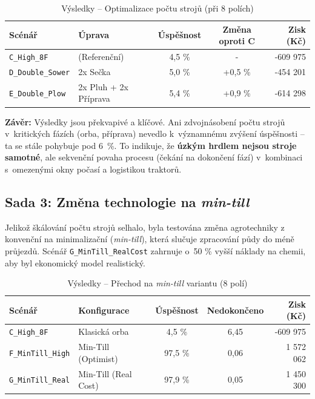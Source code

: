 \documentclass[11pt,a4paper]{article}
\begin{document}
\begin{table}[H]
    \centering
    \begin{tabular}{|l|l|c|c|r|}
        \hline
        \textbf{Scénář} & \textbf{Úprava} & \textbf{Úspěšnost} & \textbf{Změna oproti C} & \textbf{Zisk (Kč)} \\ \hline
        \texttt{C\_High\_8F} & (Referenční) & 4,5 \% & - & -609 975 \\ \hline
        \texttt{D\_Double\_Sower} & 2x Sečka & 5,0 \% & +0,5 \% & -454 201 \\ \hline
        \texttt{E\_Double\_Plow} & 2x Pluh + 2x Příprava & 5,4 \% & +0,9 \% & -614 298 \\ \hline
    \end{tabular}
    \caption{Výsledky -- Optimalizace počtu strojů (při 8 polích)}
    \label{tab:bottleneck}
\end{table}

\textbf{Závěr:} Výsledky jsou překvapivé a klíčové. Ani zdvojnásobení počtu strojů v~kritických fázích (orba, příprava) nevedlo k~významnému zvýšení úspěšnosti -- ta se stále pohybuje pod 6~\%.
To indikuje, že \textbf{úzkým hrdlem nejsou stroje samotné}, ale sekvenční povaha procesu (čekání na dokončení fází) v~kombinaci s~omezenými okny počasí a logistikou traktorů.

\subsection{Sada 3: Změna technologie na \emph{min-till}}

Jelikož škálování počtu strojů selhalo, byla testována změna agrotechniky z konvenční na minimalizační (\emph{min-till}), která slučuje zpracování půdy do méně průjezdů. Scénář \texttt{G\_MinTill\_RealCost} zahrnuje o~50 \% vyšší náklady na chemii, aby byl ekonomický model realistický.

\begin{table}[H]
    \centering
    \begin{tabular}{|l|l|c|c|r|}
        \hline
        \textbf{Scénář} & \textbf{Konfigurace} & \textbf{Úspěšnost} & \textbf{Nedokončeno} & \textbf{Zisk (Kč)} \\ \hline
        \texttt{C\_High\_8F} & Klasická orba & 4,5 \% & 6,45 & -609 975 \\ \hline
        \texttt{F\_MinTill\_High} & Min-Till (Optimist) & 97,5 \% & 0,06 & 1 572 062 \\ \hline
        \texttt{G\_MinTill\_Real} & Min-Till (Real Cost) & 97,9 \% & 0,05 & 1 450 300 \\ \hline
    \end{tabular}
    \caption{Výsledky -- Přechod na \emph{min-till} variantu (8 polí)}
    \label{tab:mintill}
\end{table}
\end{document}
